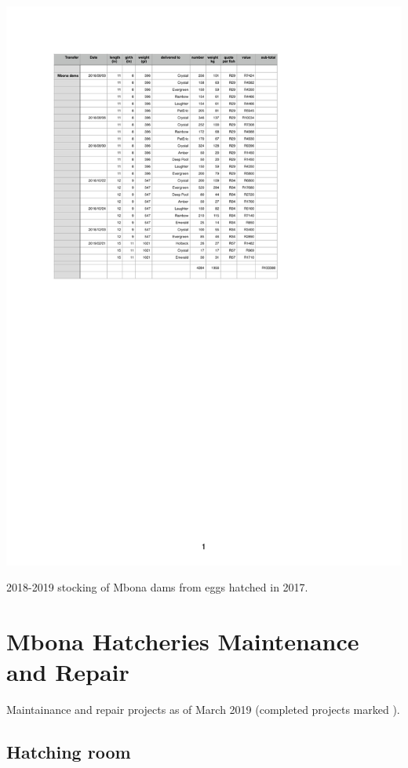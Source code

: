 \begin{table}[H]
  \centering
  \includegraphics[scale = 1.2]{tables/TablesMbonaDamSales.pdf}
   \caption{2018-2019 stocking of Mbona dams from eggs hatched in 2017.}
  \label{tab:MbonaDamSales2018}
\end{table}


\newpage
\section{Mbona Hatcheries Maintenance and Repair}

Maintainance and repair projects as of March 2019 (completed projects marked \checkmark).

\subsection{Hatching room}     

